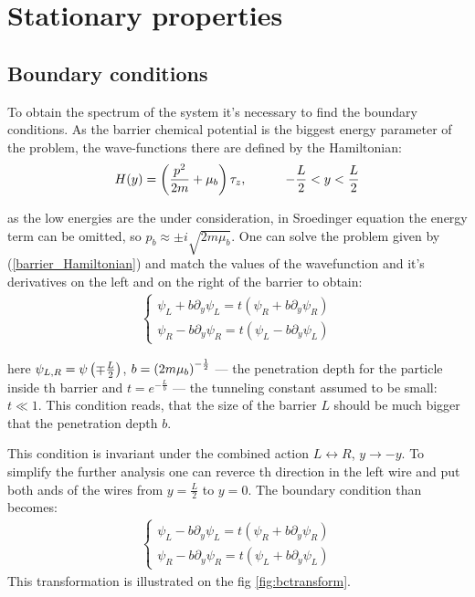 \chapter{Stationary properties} 


\section{Boundary conditions}

To obtain the spectrum of the system it's necessary to find the boundary conditions. As the barrier chemical potential  is the biggest energy parameter of the problem, the wave-functions there are defined by the Hamiltonian:
\begin{gather}
\label{barrier_Hamiltonian}
	H(y)
	=
	\left(
		\frac{p^2}{2m}
		+\mu_b
	\right)\tau_z,  ~~~~~~~~~-\frac{L}{2}<y<\frac{L}{2}
\end{gather} 

as the low energies are the under consideration, in Sroedinger equation the energy term can be omitted, so $ p_b\approx\pm i \sqrt{2m\mu_b} $. One can solve the problem given by (\ref{barrier_Hamiltonian}) and match the values of the wavefunction and it's derivatives on the left and on the right of the barrier to obtain:
\begin{gather}
	\begin{cases}
	\psi_L + b\partial_y\psi_L=t(\psi_R + b\partial_y\psi_R) \\
	\psi_R - b\partial_y\psi_R=t(\psi_L - b\partial_y\psi_L)
	\end{cases}
\end{gather}

here $ \psi_{L,R}=\psi\left(\mp\frac{L}{2}\right) $, $ b=\left({2m\mu_b}\right)^{-\frac{1}{2}} $ --- the penetration depth for the particle inside th barrier and $ t = e^{-\frac{L}{b} }$ --- the tunneling constant assumed to be small: $ t\ll 1 $. This condition reads, that the size of the barrier $ L $ should be  much bigger that the penetration depth $ b $.

This condition is invariant under the combined action $ L\leftrightarrow R $, $ y\to-y $. To simplify the further analysis one can reverce th direction in the left wire and put both ands of the wires from $ y= \frac{L}{2} $ to $ y=0 $. The boundary condition than becomes:
\begin{gather}
\label{bc_transformed}
\begin{cases}
\psi_L - b\partial_y\psi_L=t(\psi_R + b\partial_y\psi_R) \\
\psi_R - b\partial_y\psi_R=t(\psi_L + b\partial_y\psi_L)
\end{cases}
\end{gather}
This transformation is illustrated on the fig \ref{fig:bctransform}.

